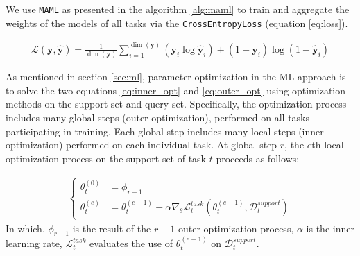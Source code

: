 
We use \verb|MAML| as presented in the algorithm \ref{alg:maml} to train and aggregate the weights of the models of all tasks via the \verb|CrossEntropyLoss| (equation \ref{eq:loss}).

\begin{align}
    \label{eq:loss}
    \mathcal{L}(\mathbf{y}, \hat{\mathbf{y}}) = \frac{1}{\dim(\mathbf{y})}\sum_{i=1}^{\dim(\mathbf{y})}{(\mathbf{y}_i\log{\hat{\mathbf{y}}_i}) + (1-\mathbf{y}_i)\log{(1-\hat{\mathbf{y}}_i)}}
\end{align}

As mentioned in section \ref{sec:ml}, parameter optimization in the ML approach is to solve the two equations \ref{eq:inner_opt} and \ref{eq:outer_opt} using optimization methods on the support set and query set. Specifically, the optimization process includes many global steps (outer optimization), performed on all tasks participating in training. Each global step includes many local steps (inner optimization) performed on each individual task. At global step $r$, the $e$th local optimization process on the support set of task $t$ proceeds as follows:

\begin{align}
    \begin{cases}
        \theta_t^{(0)} &= \phi_{r-1} \\
        \theta_t^{(e)} &= \theta_t^{(e-1)} - \alpha \nabla_{\theta} \mathcal{L}^{task}_t\left( \theta_t^{(e-1)}, \mathcal{D}_t^{support} \right)
    \end{cases}
    \label{eq:inner_sol}
\end{align} In which, $\phi_{r-1}$ is the result of the $r-1$ outer optimization process, $\alpha$ is the inner learning rate, $\mathcal{L}_t^{task}$ evaluates the use of $\theta_t^{(e-1)}$ on $\mathcal{D}_t^{support}$.


